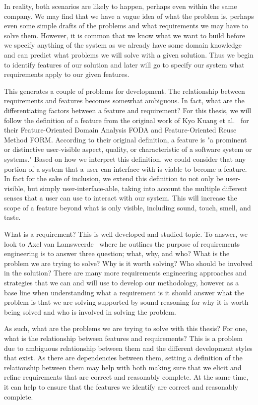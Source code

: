 In reality, both scenarios are likely to happen, perhaps even within the same company. We may find that we have a vague idea of what the problem is, perhaps even some simple drafts of the problems and what requirements we may have to solve them. However, it is common that we know what we want to build before we specify anything of the system as we already have some domain knowledge and can predict what problems we will solve with a given solution. Thus we begin to identify features of our solution and later will go to specify our system what requirements apply to our given features.

This generates a couple of problems for development. The relationship between requirements and features becomes somewhat ambiguous. In fact, what are the differentiating factors between a feature and requirement? For this thesis, we will follow the definition of a feature from the original work of Kyo Kuang et al.~\cite{kang1990feature, kang1998form} for their Feature-Oriented Domain Analysis \ac{FODA} and Feature-Oriented Reuse Method \ac{FORM}. According to their original definition, a feature is "a prominent or distinctive user-visible aspect, quality, or characteristic of a software system or systems." Based on how we interpret this definition, we could consider that any portion of a system that a user can interface with is viable to become a feature. In fact for the sake of inclusion, we extend this definition to not only be user-visible, but simply user-interface-able, taking into account the multiple different senses that a user can use to interact with our system. This will increase the scope of a feature beyond what is only visible, including sound, touch, smell, and taste. 

What is a requirement? This is well developed and studied topic. To answer, we look to Axel van Lamsweerde~\cite{lamsweerde2009requirements} where he outlines the purpose of requirements engineering is to answer three question; what, why, and who? What is the problem we are trying to solve? Why is it worth solving? Who should be involved in the solution? There are many more requirements engineering approaches and strategies that we can and will use to develop our methodology, however as a base line when understanding what a requirement is it should answer what the problem is that we are solving supported by sound reasoning for why it is worth being solved and who is involved in solving the problem. 

As such, what are the problems we are trying to solve with this thesis? For one, what is the relationship between features and requirements? This is a problem due to ambiguous relationship between them and the different development styles that exist. As there are dependencies between them, setting a definition of the relationship between them may help with both making sure that we elicit and refine requirements that are correct and reasonably complete. At the same time, it can help to ensure that the features we identify are correct and reasonably complete.

